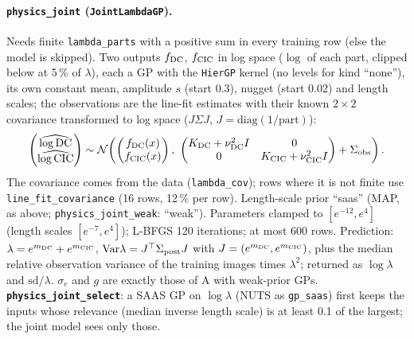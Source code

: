 \documentclass[10pt]{article}
\newcommand{\code}[1]{\texttt{#1}}
\newcommand{\se}{\sigma_e}
\begin{document}
\paragraph{\code{physics\_joint} (\code{JointLambdaGP}).} Needs finite \code{lambda\_parts} with a positive sum in every
training row (else the model is skipped). Two outputs $f_{\rm DC}$, $f_{\rm CIC}$ in log space ($\log$ of each part,
clipped below at 5\,\% of $\lambda$), each a GP with the \code{HierGP} kernel (no levels for kind ``none''), its own
constant mean, amplitude $s$ (start 0.3), nugget (start 0.02) and length scales; the observations are the line-fit
estimates with their known $2\times2$ covariance transformed to log space ($J\Sigma J$, $J = \mathrm{diag}(1/\mathrm{part})$):
\[ \begin{pmatrix}\widehat{\log\mathrm{DC}}\\ \widehat{\log\mathrm{CIC}}\end{pmatrix} \sim
   \mathcal N\!\left(\begin{pmatrix} f_{\rm DC}(x)\\ f_{\rm CIC}(x)\end{pmatrix},\ \begin{pmatrix}K_{\rm DC} + \nu_{\rm DC}^2 I & 0\\ 0 & K_{\rm CIC} + \nu_{\rm CIC}^2 I\end{pmatrix} + \Sigma_{\rm obs}\right). \]
The covariance comes from the data (\code{lambda\_cov}); rows where it is not finite use \code{line\_fit\_covariance}
(16 rows, 12\,\% per row). Length-scale prior ``saas'' (MAP, as above; \code{physics\_joint\_weak}: ``weak''). Parameters
clamped to $[e^{-12}, e^4]$ (length scales $[e^{-7}, e^4]$); L-BFGS 120 iterations; at most 600 rows. Prediction:
$\lambda = e^{m_{\rm DC}} + e^{m_{\rm CIC}}$, $\mathrm{Var}\lambda = J^\top \Sigma_{\rm post} J$ with $J = (e^{m_{\rm DC}},
e^{m_{\rm CIC}})$, plus the median relative observation variance of the training images times $\lambda^2$; returned as
$\log\lambda$ and $\mathrm{sd}/\lambda$. $\se$ and $g$ are exactly those of A with weak-prior GPs.
\textbf{\code{physics\_joint\_select}}: a SAAS GP on $\log\lambda$ (NUTS as \code{gp\_saas}) first keeps the inputs whose
relevance (median inverse length scale) is at least 0.1 of the largest; the joint model sees only those.
\end{document}
